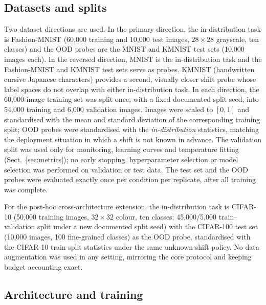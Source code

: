 \documentclass[11pt,a4paper]{article}
\begin{document}
\subsection{Datasets and splits}\label{sec:datasets}

Two dataset directions are used. In the primary direction, the
in-distribution task is Fashion-MNIST \citep{xiao2017} (60{,}000 training
and 10{,}000 test images, $28\times28$ grayscale, ten classes) and the OOD
probes are the MNIST \citep{lecun1998} and KMNIST \citep{clanuwat2018}
test sets (10{,}000 images each). In the reversed direction, MNIST is the
in-distribution task and the Fashion-MNIST and KMNIST test sets serve as
probes. KMNIST (handwritten cursive Japanese characters) provides a
second, visually closer shift probe whose label spaces do not overlap with
either in-distribution task. In each direction, the 60{,}000-image training
set was split once, with a fixed documented split seed, into 54{,}000
training and 6{,}000 validation images. Images were scaled to $[0,1]$ and
standardised with the mean and standard deviation of the corresponding
training split; OOD probes were standardised with the \emph{in-distribution}
statistics, matching the deployment situation in which a shift is not known
in advance. The validation split was used only for monitoring, learning
curves and temperature fitting (Sect.~\ref{sec:metrics}); no early
stopping, hyperparameter selection or model selection was performed on
validation or test data. The test set and the OOD probes were evaluated
exactly once per condition per replicate, after all training was complete.

For the post-hoc cross-architecture extension, the in-distribution task is
CIFAR-10 \citep{krizhevsky2009} (50{,}000 training images, $32\times32$
colour, ten classes; 45{,}000/5{,}000 train--validation split under a new
documented split seed) with the CIFAR-100 test set (10{,}000 images, 100
fine-grained classes) as the OOD probe, standardised with the CIFAR-10
train-split statistics under the same unknown-shift policy. No data
augmentation was used in any setting, mirroring the core protocol and
keeping budget accounting exact.

\subsection{Architecture and training}\label{sec:training}
\end{document}
